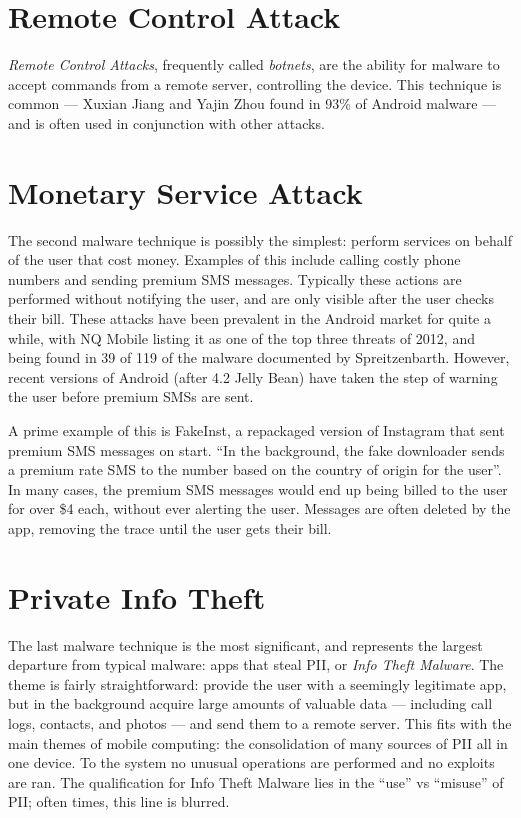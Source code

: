 \section{Remote Control Attack}
\textit{Remote Control Attacks}, frequently called \textit{botnets}, are the ability for malware to accept commands from a remote server, controlling the device. This technique is common --- Xuxian Jiang
 and Yajin Zhou\citep{zhou2012dissecting} found in 93\% of Android malware --- and is often used in conjunction with other attacks\citep{spreitzenbarth2013}.

\section{Monetary Service Attack}
\label{sec:premiumsms}
The second malware technique is possibly the simplest: perform services on behalf of the user that cost money. Examples of this include calling costly phone numbers and sending premium SMS messages. Typically these actions are performed without notifying the user, and are only visible after the user checks their bill. These attacks have been prevalent in the Android market for quite a while, with NQ Mobile\citep{nq2013} listing it as one of the top three threats of 2012, and being found in 39 of 119 of the malware documented by Spreitzenbarth\citep{spreitzenbarth2013}. However, recent versions of Android (after 4.2 Jelly Bean\citep{androidjbsecurity}) have taken the step of warning the user before premium SMSs are sent. %

A prime example of this is FakeInst\citep{avastfakeinst}, a repackaged version of Instagram\citep{instagramandroid} that sent premium SMS messages on start. ``In the background, the fake downloader sends a premium rate SMS to the number based on the country of origin for the user''\citep{avastfakeinst}. In many cases, the premium SMS messages would end up being billed to the user for over \$4 each\citep{avastfakeinst}, without ever alerting the user. Messages are often deleted by the app, removing the trace until the user gets their bill.

\section{Private Info Theft}
The last malware technique is the most significant, and represents the largest departure from typical malware: apps that steal PII, or \textit{Info Theft Malware}. The theme is fairly straightforward: provide the user with a seemingly legitimate app, but in the background acquire large amounts of valuable data --- including call logs, contacts, and photos --- and send them to a remote server. This fits with the main themes of mobile computing: the consolidation of many sources of PII all in one device. 
To the system no unusual operations are performed and no exploits are ran. The qualification for Info Theft Malware lies in the ``use'' vs ``misuse'' of PII; often times, this line is blurred.

